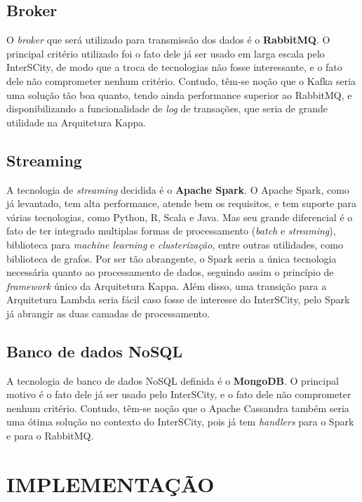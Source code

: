 \subsection{Broker}

O \textit{broker} que será utilizado para transmissão dos dados é o
\textbf{RabbitMQ}. O principal critério utilizado foi o fato dele já ser usado
em larga escala pelo InterSCity, de modo que a troca de tecnologias não fosse
interessante, e o fato dele não comprometer nenhum critério. Contudo, têm-se
noção que o Kafka seria uma solução tão boa quanto, tendo ainda performance
superior ao RabbitMQ, e disponibilizando a funcionalidade de \textit{log} de
transações, que seria de grande utilidade na Arquitetura Kappa.

\subsection{Streaming}

A tecnologia de \textit{streaming} decidida é o \textbf{Apache Spark}. O Apache
Spark, como já levantado, tem alta performance, atende bem os requisitos, e tem
suporte para várias tecnologias, como Python, R, Scala e Java. Mas seu grande
diferencial é o fato de ter integrado multiplas formas de processamento
(\textit{batch} e \textit{streaming}), biblioteca para
\textit{machine learning} e \textit{clusterização}, entre outras utilidades,
como biblioteca de grafos. Por ser tão abrangente, o Spark seria a única tecnologia
necessária quanto ao processamento de dados, seguindo assim o princípio de
\textit{framework} único da Arquitetura Kappa. Além disso, uma transição para a
Arquitetura Lambda seria fácil caso fosse de interesse do InterSCity, pelo
Spark já abrangir as duas camadas de processamento.

\subsection{Banco de dados NoSQL}

A tecnologia de banco de dados NoSQL definida é o \textbf{MongoDB}. O principal
motivo é o fato dele já ser usado pelo InterSCity, e o fato dele não
comprometer nenhum critério. Contudo, têm-se noção que o Apache Cassandra
também seria uma ótima solução no contexto do InterSCity, pois já tem
\textit{handlers} para o Spark e para o RabbitMQ.

\section{IMPLEMENTAÇÃO}
